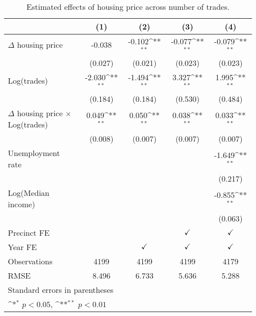 \begin{table}[htbp]\centering
\def\sym#1{\ifmmode^{#1}\else\(^{#1}\)\fi}
\caption{Estimated effects of housing price across number of trades.} \label{table:econactivity}
\begin{tabular}{l*{4}{c}}
\hline\hline
                    &\multicolumn{1}{c}{(1)}        &\multicolumn{1}{c}{(2)}        &\multicolumn{1}{c}{(3)}        &\multicolumn{1}{c}{(4)}        \\
\hline
$\Delta$ housing price&      -0.038        &      -0.102\sym{**}&      -0.077\sym{**}&      -0.079\sym{**}\\
                    &     (0.027)        &     (0.021)        &     (0.023)        &     (0.023)        \\
[1em]
Log(trades)         &      -2.030\sym{**}&      -1.494\sym{**}&       3.327\sym{**}&       1.995\sym{**}\\
                    &     (0.184)        &     (0.184)        &     (0.530)        &     (0.484)        \\
[1em]
$\Delta$ housing price $\times$ Log(trades)&       0.049\sym{**}&       0.050\sym{**}&       0.038\sym{**}&       0.033\sym{**}\\
                    &     (0.008)        &     (0.007)        &     (0.007)        &     (0.007)        \\
[1em]
Unemployment rate   &                    &                    &                    &      -1.649\sym{**}\\
                    &                    &                    &                    &     (0.217)        \\
[1em]
Log(Median income)  &                    &                    &                    &      -0.855\sym{**}\\
                    &                    &                    &                    &     (0.063)        \\
[1em]
\hline Precinct FE  &                    &                    &$\checkmark$        &$\checkmark$        \\
[1em]
Year FE             &                    &$\checkmark$        &$\checkmark$        &$\checkmark$        \\
\hline
Observations        &        4199        &        4199        &        4199        &        4179        \\
RMSE                &       8.496        &       6.733        &       5.636        &       5.288        \\
\hline\hline
\multicolumn{5}{l}{\footnotesize Standard errors in parentheses}\\
\multicolumn{5}{l}{\footnotesize \sym{*} \(p<0.05\), \sym{**} \(p<0.01\)}\\
\end{tabular}
\end{table}
